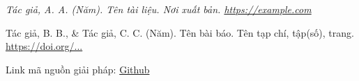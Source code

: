 {\itshape
Tác giả, A. A. (Năm). Tên tài liệu. Nơi xuất bản. \url{https://example.com}

Tác giả, B. B., \& Tác giả, C. C. (Năm). Tên bài báo. Tên tạp chí, tập(số), trang. \url{https://doi.org/...}
\par}

Link mã nguồn giải pháp: \href{https://github.com/}{Github}
